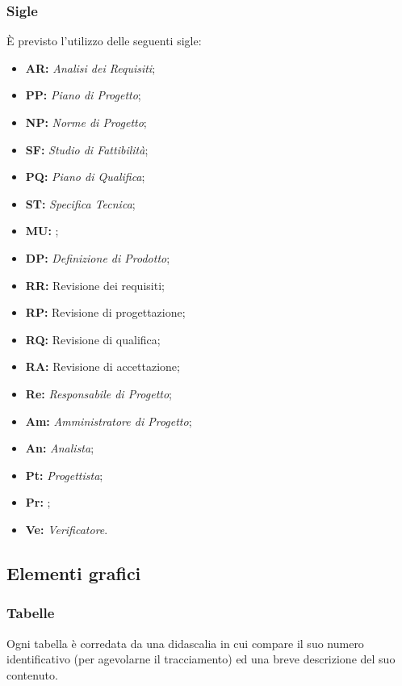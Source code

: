 \documentclass[../NormediProgetto.tex]{subfiles}
\begin{document}
\subsubsection{Sigle}

È previsto l’utilizzo delle seguenti sigle: 

\begin{itemize}
	\item{\textbf{AR:}} \textit{Analisi dei Requisiti};
	\item{\textbf{PP:}} \textit{Piano di Progetto};
	\item{\textbf{NP:}} \textit{Norme di Progetto};
	\item{\textbf{SF:}} \textit{Studio di Fattibilità};
	\item{\textbf{PQ:}} \textit{Piano di Qualifica};
	\item{\textbf{ST:}} \textit{Specifica Tecnica};
	\item{\textbf{MU:}} ;
	\item{\textbf{DP:}} \textit{Definizione di Prodotto};
	\item{\textbf{RR:}} Revisione dei requisiti;
	\item{\textbf{RP:}} Revisione di progettazione;
	\item{\textbf{RQ:}} Revisione di qualifica;
	\item{\textbf{RA:}} Revisione di accettazione;
	\item{\textbf{Re:}} \textit{Responsabile di Progetto};
	\item{\textbf{Am:}} \textit{Amministratore di Progetto};
	\item{\textbf{An:}} \textit{Analista};
	\item{\textbf{Pt:}} \textit{Progettista};
	\item{\textbf{Pr:}} ;
	\item{\textbf{Ve:}} \textit{Verificatore}.
\end{itemize}

\subsection{Elementi grafici}

\subsubsection{Tabelle}

Ogni tabella è corredata da una didascalia in cui compare il suo numero identificativo (per agevolarne il tracciamento) ed una breve descrizione del suo contenuto.
\end{document}
